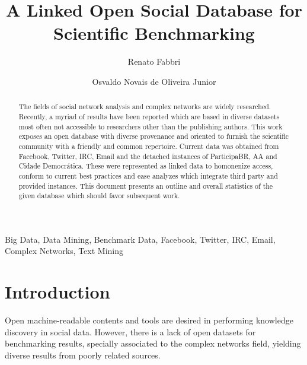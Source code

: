 \documentclass[review]{elsarticle}
\begin{document}
%
\begin{frontmatter}
%
\title{A Linked Open Social Database for Scientific Benchmarking}
%
\author[pwr]{Renato Fabbri}
%
\author[pwr]{Osvaldo Novais de Oliveira Junior}
%
\address[pwr]{S\~ao Carlos Institute of Physics, S\~ao Paulo
University, Brazil}
%
%
\begin{abstract}
The fields of social network analysis and complex networks
are widely researched.
Recently, a myriad of results have been reported which are based in
diverse datasets most often not accessible to researchers other than the publishing authors.
This work exposes an open database with diverse provenance and oriented
to furnish the scientific community with a friendly and common repertoire.
Current data was obtained from Facebook, Twitter, IRC, Email and the
detached instances of ParticipaBR, AA and Cidade Democr\'atica.
These were represented as linked data to homonenize access,
conform to current best practices and ease analyzes which integrate third
party and provided instances.
This document presents an outline and overall statistics of the given
database which should favor subsequent work.
\end{abstract}
%
\begin{keyword}
Big Data, Data Mining, Benchmark Data, Facebook, Twitter, IRC, Email,
Complex Networks, Text Mining
\end{keyword}

\end{frontmatter}

\section{Introduction}


Open machine-readable contents and tools are desired
in performing knowledge discovery in social data.
However, there is a lack of open datasets for benchmarking results,
specially associated to the complex networks field,
yielding diverse results from poorly related sources.
\end{document}
